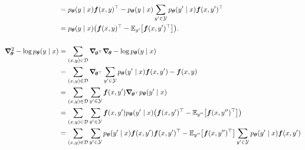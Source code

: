 \begin{align*}
                                                               & = p_{\vec{\theta}}(y\mid x) \transpose{\vec{f}(x,y)} - p_{\vec{\theta}}(y\mid x) \sum_{y'\in\mathcal{Y}} p_{\vec{\theta}}(y'\mid x) \transpose{\vec{f}(x,y')}                                                                                                                                               \\
                                                               & = p_{\vec{\theta}}(y\mid x) \lft( \transpose{\vec{f}(x,y)} - \E_{y'} \lft[ \transpose{\vec{f}(x,y')} \rgt] \rgt).                                                                                                                                                                                           \\
    \\
    \hess{-\log p_{\vec{\theta}}(y\mid x)}{\vec{\theta}}       & = \sum_{(x,y)\in\mathcal{D}} \grad{ \grad{-\log p_{\vec{\theta}}(y\mid x)}{\vec{\theta}} }{\transpose{\vec{\theta}}}                                                                                                                                                                                        \\
                                                               & = \sum_{(x,y)\in\mathcal{D}} \grad{\sum_{y'\in\mathcal{Y}} p_{\vec{\theta}}(y'\mid x) \vec{f}(x,y') - \vec{f}(x,y)}{\transpose{\vec{\theta}}}                                                                                                                                                               \\
                                                               & = \sum_{(x,y)\in\mathcal{D}} \sum_{y'\in\mathcal{Y}} \vec{f}(x,y') \grad{p_{\vec{\theta}}(y'\mid x)}{\transpose{\vec{\theta}}}                                                                                                                                                                              \\
                                                               & = \sum_{(x,y)\in\mathcal{D}} \sum_{y'\in\mathcal{Y}} \vec{f}(x,y') p_{\vec{\theta}}(y'\mid x) \lft( \transpose{\vec{f}(x,y')} - \E_{y''} \lft[ \transpose{\vec{f}(x,y'')} \rgt] \rgt)                                                                                                                       \\
                                                               & = \sum_{(x,y)\in\mathcal{D}} \sum_{y'\in\mathcal{Y}} p_{\vec{\theta}}(y'\mid x) \vec{f}(x,y') \transpose{\vec{f}(x,y')}  - \E_{y''} \lft[ \transpose{\vec{f}(x,y'')} \rgt] \sum_{y'\in\mathcal{Y}} p_{\vec{\theta}}(y'\mid x) \vec{f}(x,y')                                                                 \\

\end{align*}
